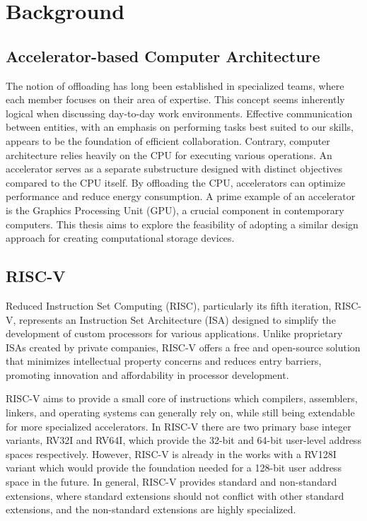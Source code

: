 \section{Background}
\subsection{Accelerator-based Computer Architecture}\label{sec:ACA}
The notion of offloading has long been established in specialized teams, where
each member focuses on their area of expertise. This concept seems inherently
logical when discussing day-to-day work environments. Effective communication
between entities, with an emphasis on performing tasks best suited to our
skills, appears to be the foundation of efficient collaboration. Contrary,
computer architecture relies heavily on the CPU for executing various
operations. An accelerator serves as a separate substructure designed with
distinct objectives compared to the CPU itself. By offloading the CPU,
accelerators can optimize performance and reduce energy consumption\cite{AA}. A
prime example of an accelerator is the Graphics Processing Unit (GPU), a crucial
component in contemporary computers. This thesis aims to explore the feasibility
of adopting a similar design approach for creating computational storage
devices.



\subsection{RISC-V}
Reduced Instruction Set Computing (RISC), particularly its fifth iteration,
RISC-V, represents an Instruction Set Architecture (ISA) designed to simplify
the development of custom processors for various applications. Unlike
proprietary ISAs created by private companies, RISC-V offers a free and
open-source solution that minimizes intellectual property concerns and reduces
entry barriers, promoting innovation and affordability in processor
development\cite{ISAfree}.

RISC-V aims to provide a small core of instructions which compilers, assemblers,
linkers, and operating systems can generally rely on, while still being
extendable for more specialized accelerators. In RISC-V there are two primary
base integer variants, RV32I and RV64I, which provide the 32-bit and 64-bit
user-level address spaces respectively. However, RISC-V is already in the works
with a RV128I variant which would provide the foundation needed for a 128-bit
user address space in the future. In general, RISC-V provides standard and
non-standard extensions, where standard extensions should not conflict with
other standard extensions, and the non-standard extensions are highly
specialized.

